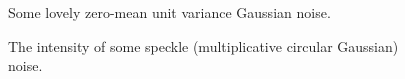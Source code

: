 \documentclass{article}
\begin{document}
\begin{figure}
  
  \caption{Some lovely zero-mean unit variance Gaussian noise.}
\end{figure}

\begin{figure}
  
  \caption{The intensity of some speckle (multiplicative circular Gaussian) noise.}
\end{figure}
\end{document}
